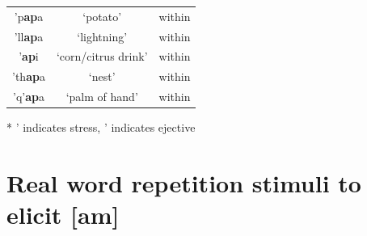 \documentclass[a4paper,man,floatsintext,natbib,donotrepeattitle, apacite]{apa6}
\begin{document}
\begin{table}
\begin{tabular}{c | c| c}
\hline

\footnotesize{\textsf{'}p\textbf{ap}a} & `potato' & within \\
\footnotesize{\textsf{'}ll\textbf{ap}a} & `lightning' & within \\
\footnotesize{\textsf{'}\textbf{ap}i} & `corn/citrus drink' & within \\
\footnotesize{\textsf{'}th\textbf{ap}a} & `nest' & within \\
\footnotesize{\textsf{'}q'\textbf{ap}a} & `palm of hand' & within \\

 \hline
\end{tabular}\par
\smallskip
* ' indicates stress, \textsf{'} indicates ejective\par
\end{table}


\section{Real word repetition stimuli to elicit [am]}\label{app:app-C}
\end{document}
